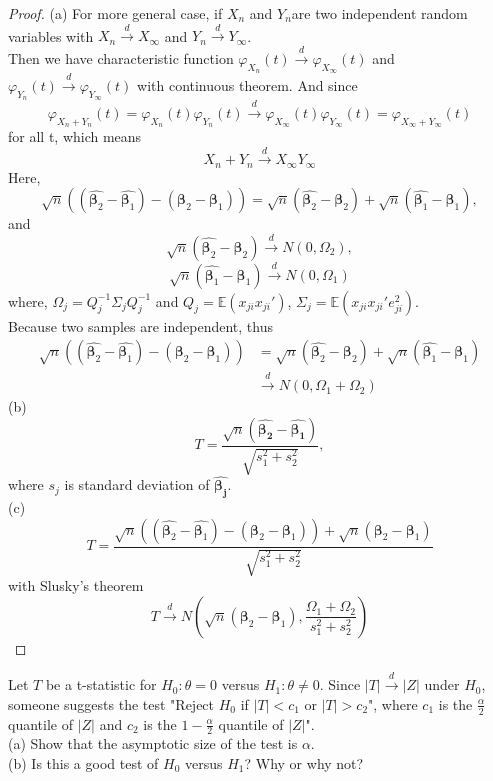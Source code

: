 \documentclass[12pt]{article}
\newenvironment{question}[2][Question]{\begin{trivlist}
\item[\hskip \labelsep {\bmseries #1}\hskip \labelsep {\bmseries #2.}]}{\end{trivlist}}
\begin{document}
\begin{proof}
(a) For more general case, if $X_n$ and $Y_n$are two independent random variables with $X_n\xrightarrow{d}X_\infty$ and $Y_n\xrightarrow{d}Y_\infty$.\\
Then we have characteristic function $\varphi_{X_n}(t)\xrightarrow{d}\varphi_{X_\infty}(t)$ and $\varphi_{Y_n}(t)\xrightarrow{d}\varphi_{Y_\infty}(t)$ with continuous theorem. And since $$\varphi_{X_n+Y_n}(t) = \varphi_{X_n}(t)\varphi_{Y_n}(t)\xrightarrow{d}\varphi_{X_\infty
}(t)\varphi_{Y_\infty}(t)=\varphi_{X_\infty+Y_\infty}(t)$$
for all t, which means $$X_n+Y_n \xrightarrow{d} X_\infty Y_\infty$$
Here, $$\sqrt{n}((\hat{\bm{\beta}_2}-\hat{\bm{\beta}_1})-(\bm{\beta}_2-\bm{\beta}_1)) = \sqrt{n}(\hat{\bm{\beta}_2} - \bm{\beta}_2)+\sqrt{n}(\hat{\bm{\beta}_1} - \bm{\beta}_1),$$
and $$\sqrt{n}(\hat{\bm{\beta}_2} - \bm{\beta}_2) \xrightarrow{d} N(0,\Omega_2),$$
$$\sqrt{n}(\hat{\bm{\beta}_1} - \bm{\beta}_1) \xrightarrow{d} N(0,\Omega_1)$$
where, $\Omega_j = Q_j^{-1}\Sigma_j Q_j^{-1}$ and $Q_j = \mathbb{E}(x_{ji} x_{ji}')$, $\Sigma_j = \mathbb{E}(x_{ji} x_{ji}'e_{ji}^2)$.\\
Because two samples are independent, thus
\begin{align*}
\sqrt{n}((\hat{\bm{\beta}_2}-\hat{\bm{\beta}_1})-(\bm{\beta}_2-\bm{\beta}_1)) 
&= \sqrt{n}(\hat{\bm{\beta}_2} - \bm{\beta}_2) + \sqrt{n}(\hat{\bm{\beta}_1} - \bm{\beta}_1)\\
&\xrightarrow{d} N(0,\Omega_1+\Omega_2)
\end{align*}
(b) $$T = \frac{\sqrt{n}(\hat{\bm{\beta_2}}-\hat{\bm{\beta_1}})}{\sqrt{s_1^2+s_2^2}},$$
where $s_j$ is standard deviation of $\hat{\bm{\beta_j}}$.\\
(c) $$T = \frac{\sqrt{n}((\hat{\bm{\beta}_2}-\hat{\bm{\beta}_1})-(\bm{\beta}_2-\bm{\beta}_1))+\sqrt{n}(\bm{\beta}_2-\bm{\beta}_1)}{\sqrt{s_1^2+s_2^2}}$$
with Slusky's theorem
$$T\xrightarrow{d}N(\sqrt{n}(\bm{\beta}_2-\bm{\beta}_1),\frac{\Omega_1+\Omega_2}{s_1^2+s_2^2})$$
\end{proof}

\begin{question}{9.3}
Let $T$ be a t-statistic for $H_0: \theta = 0$ versus $H_1:\theta\ne 0$. Since $|T|\xrightarrow{d} |Z|$ under $H_0$, someone suggests the test "Reject $H_0$ if $|T| < c_1$ or $|T|>c_2$", where $c_1$ is the $\frac{\alpha}{2}$ quantile of $|Z|$ and $c_2$ is the $1-\frac{\alpha}{2}$ quantile of $|Z|$".\\
(a) Show that the asymptotic size of the test is $\alpha$.\\
(b) Is this a good test of $H_0$ versus $H_1$? Why or why not?
\end{question}
\end{document}
